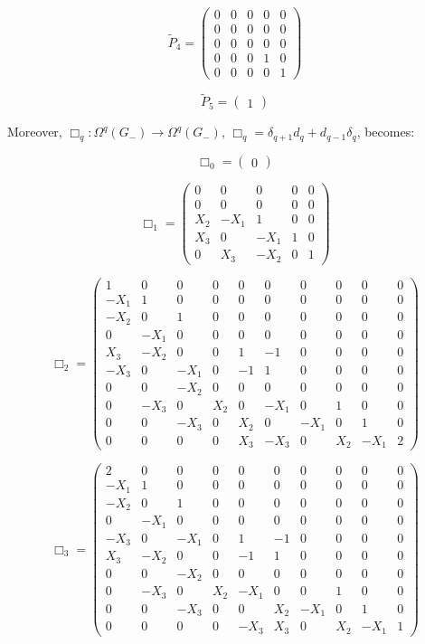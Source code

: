 \documentclass[reqno,12pt]{amsart}
\theoremstyle{plain}
\theoremstyle{definition}
\begin{document}
$$
\tilde P_4=\left(\begin{array}{cc|c|cc}
0&0&0&0&0\\
0&0&0&0&0\\\hline
0&0&0&0&0\\\hline
0&0&0&1&0\\
0&0&0&0&1
\end{array}\right)
$$

$$
\tilde P_5=\left(\begin{array}{c}
1
\end{array}\right)
$$


Moreover, $\Box_q\colon\Omega^q(G_-)\to\Omega^q(G_-)$, $\Box_q=\delta_{q+1}d_q+d_{q-1}\delta_q$, becomes:

$$
\Box_0=\left(\begin{array}{c}
0
\end{array}\right)
$$

$$
\Box_1=\left(\begin{array}{cc|c|cc}
0& 0&  0&  0&0\\
0& 0&  0&  0&0\\\hline
X_2&-X_1&1&  0&0\\\hline
X_3&0&  -X_1&1&0\\
0& X_3& -X_2&0&1
\end{array}\right)
$$

$$
\Box_2=\left(\begin{array}{c|cc|cccc|cc|c}
1&  0&  0&  0& 0& 0&  0&  0& 0&  0\\\hline
-X_1&1&  0&  0& 0& 0&  0&  0& 0&  0\\
-X_2&0&  1&  0& 0& 0&  0&  0& 0&  0\\\hline
0&  -X_1&0&  0& 0& 0&  0&  0& 0&  0\\
X_3& -X_2&0&  0& 1& -1& 0&  0& 0&  0\\
-X_3&0&  -X_1&0& -1&1&  0&  0& 0&  0\\
0&  0&  -X_2&0& 0& 0&  0&  0& 0&  0\\\hline
0&  -X_3&0&  X_2&0& -X_1&0&  1& 0&  0\\
0&  0&  -X_3&0& X_2&0&  -X_1&0& 1&  0\\\hline
0&  0&  0&  0& X_3&-X_3&0&  X_2&-X_1&2
\end{array}\right)
$$

$$
\Box_3=\left(\begin{array}{c|cc|cccc|cc|c}
2&  0&  0&  0& 0&  0& 0&  0& 0&  0\\\hline
-X_1&1&  0&  0& 0&  0& 0&  0& 0&  0\\
-X_2&0&  1&  0& 0&  0& 0&  0& 0&  0\\\hline
0&  -X_1&0&  0& 0&  0& 0&  0& 0&  0\\
-X_3&0&  -X_1&0& 1&  -1&0&  0& 0&  0\\
X_3& -X_2&0&  0& -1& 1& 0&  0& 0&  0\\
0&  0&  -X_2&0& 0&  0& 0&  0& 0&  0\\\hline
0&  -X_3&0&  X_2&-X_1&0& 0&  1& 0&  0\\
0&  0&  -X_3&0& 0&  X_2&-X_1&0& 1&  0\\\hline
0&  0&  0&  0& -X_3&X_3&0&  X_2&-X_1&1
\end{array}\right)
$$
\end{document}
